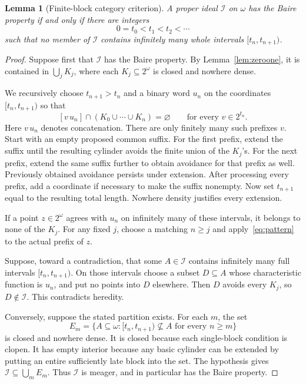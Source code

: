 \documentclass[11pt,a4paper]{article}
\newtheorem{lemma}[theorem]{Lemma}
\theoremstyle{definition}
\theoremstyle{remark}
\newcommand{\I}{\mathcal I}
\begin{document}
\begin{lemma}[Finite-block category criterion]
\label{lem:criterion}
A proper ideal $\I$ on $\omega$ has the Baire property if and only if
there are integers
\[
               0=t_0<t_1<t_2<\cdots
\]
such that no member of $\I$ contains infinitely many whole intervals
$[t_n,t_{n+1})$.
\end{lemma}
\begin{proof}
Suppose first that $\I$ has the Baire property. By
Lemma~\ref{lem:zeroone}, it is contained in $\bigcup_j K_j$, where each
$K_j\subseteq2^\omega$ is closed and nowhere dense.

We recursively choose $t_{n+1}>t_n$ and a binary word $u_n$ on the
coordinates $[t_n,t_{n+1})$ so that
\begin{equation}
\label{eq:pattern}
 [v\,u_n]\cap(K_0\cup\cdots\cup K_n)=\varnothing
             \qquad\text{for every }v\in2^{t_n}.
\end{equation}
Here $v\,u_n$ denotes concatenation. There are only finitely many such
prefixes $v$. Start with an empty proposed common suffix. For the first
prefix, extend the suffix until the resulting cylinder avoids the
finite union of the $K_j$'s. For the next prefix, extend the same suffix
further to obtain avoidance for that prefix as well. Previously obtained
avoidance persists under extension. After processing every prefix, add
a coordinate if necessary to make the suffix nonempty. Now set
$t_{n+1}$ equal to the resulting total length. Nowhere density justifies
every extension.

If a point $z\in2^\omega$ agrees with $u_n$ on infinitely many of these
intervals, it belongs to none of the $K_j$. For any fixed $j$, choose a
matching $n\ge j$ and apply~\eqref{eq:pattern} to the actual prefix of
$z$.

Suppose, toward a contradiction, that some $A\in\I$ contains infinitely
many full intervals $[t_n,t_{n+1})$. On those intervals choose a subset
$D\subseteq A$ whose characteristic function is $u_n$, and put no
points into $D$ elsewhere. Then $D$ avoids every $K_j$, so $D\notin\I$.
This contradicts heredity.

Conversely, suppose the stated partition exists. For each $m$, the set
\[
 E_m=\{A\subseteq\omega:
           [t_n,t_{n+1})\nsubseteq A\text{ for every }n\ge m\}
\]
is closed and nowhere dense. It is closed because each single-block
condition is clopen. It has empty interior because any basic cylinder
can be extended by putting an entire sufficiently late block into the
set. The hypothesis gives $\I\subseteq\bigcup_m E_m$. Thus $\I$ is
meager, and in particular has the Baire property.
\end{proof}
\end{document}
